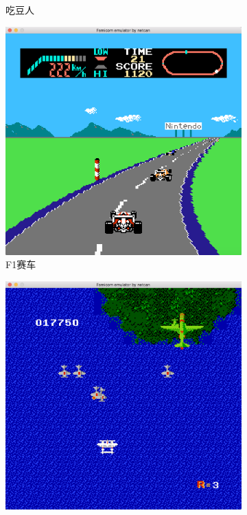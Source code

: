 \documentclass[a4paper]{ltxdoc}
\begin{document}
{\begin{figure}[h]
\begin{subfigure}[b]{0.49\textwidth}
			\caption{吃豆人}
		\end{subfigure}
		\begin{subfigure}[b]{0.49\textwidth}
			\includegraphics[width=\textwidth]{images/F1.png}
			\caption{F1赛车}
		\end{subfigure}
		\begin{subfigure}[b]{0.49\textwidth}
			\includegraphics[width=\textwidth]{images/1942.png}

\end{subfigure}
\end{figure}}
\end{document}
